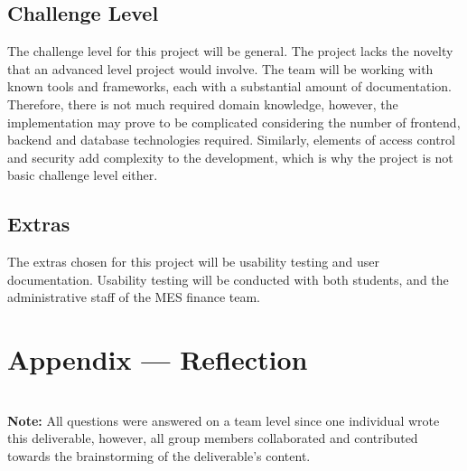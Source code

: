 \documentclass{article}
\begin{document}

\subsection{Challenge Level}

The challenge level for this project will be general. The project lacks the novelty that an advanced level project would involve. The team will be working with known tools and frameworks, each with a substantial amount of documentation. Therefore, there is not much required domain knowledge, however, the implementation may prove to be complicated considering the number of frontend, backend and database technologies required. Similarly, elements of access control and security add complexity to the development, which is why the project is not basic challenge level either.

\subsection{Extras}

The extras chosen for this project will be usability testing and user documentation. Usability testing will be conducted with both students, and the administrative staff of the MES finance team.

\newpage{}

\section*{Appendix --- Reflection}


\\

\textbf{Note:} All questions were answered on a team level since one individual wrote this deliverable, however, all group members collaborated and contributed towards the brainstorming of the deliverable's content.
\end{document}
